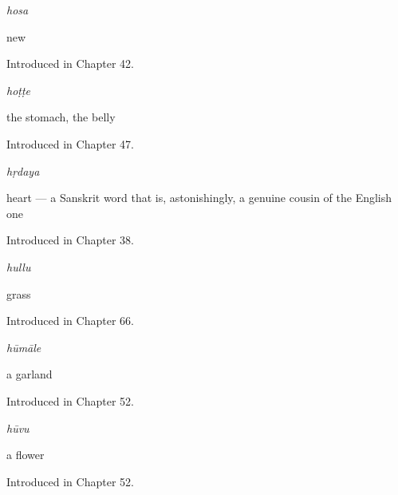 \noindent\begin{minipage}[t]{\linewidth}
\raggedright
\textbf{}\enspace\emph{hosa}\par
\small new\par
\footnotesize Introduced in Chapter 42.
\end{minipage}\par\medskip

\noindent\begin{minipage}[t]{\linewidth}
\raggedright
\textbf{}\enspace\emph{hoṭṭe}\par
\small the stomach, the belly\par
\footnotesize Introduced in Chapter 47.
\end{minipage}\par\medskip

\noindent\begin{minipage}[t]{\linewidth}
\raggedright
\textbf{}\enspace\emph{hṛdaya}\par
\small heart — a Sanskrit word that is, astonishingly, a genuine cousin of the English one\par
\footnotesize Introduced in Chapter 38.
\end{minipage}\par\medskip

\noindent\begin{minipage}[t]{\linewidth}
\raggedright
\textbf{}\enspace\emph{hullu}\par
\small grass\par
\footnotesize Introduced in Chapter 66.
\end{minipage}\par\medskip

\noindent\begin{minipage}[t]{\linewidth}
\raggedright
\textbf{}\enspace\emph{hūmāle}\par
\small a garland\par
\footnotesize Introduced in Chapter 52.
\end{minipage}\par\medskip

\noindent\begin{minipage}[t]{\linewidth}
\raggedright
\textbf{}\enspace\emph{hūvu}\par
\small a flower\par
\footnotesize Introduced in Chapter 52.
\end{minipage}\par\medskip

